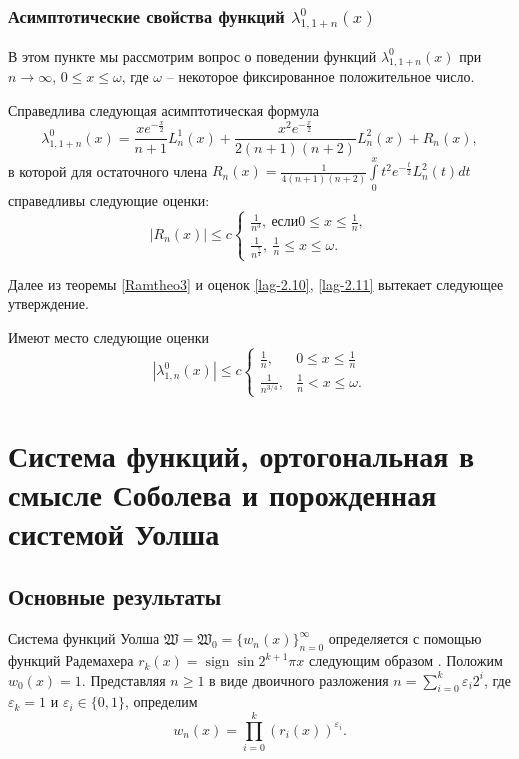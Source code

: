 \subsection{Асимптотические свойства функций $\lambda_{1,1+n}^{0}(x)$}
В этом пункте мы рассмотрим вопрос о поведении функций $\lambda_{1,1+n}^{0}(x)$ при $n\rightarrow\infty$, $0\leq x\leq \omega$, где $\omega$ -- некоторое фиксированное положительное число.
\begin{theorem}\label{Ramtheo3}
	Справедлива следующая асимптотическая формула
	\begin{equation*}
	\lambda_{1,1+n}^{0}(x) = \frac{xe^{-\frac{x}{2}}}{n+1}L_n^1(x)+\frac{x^2e^{-\frac{x}{2}}}{2(n+1)(n+2)}L_n^2(x)+R_n(x),
	\end{equation*}
	в которой для остаточного члена $R_n(x)=\frac{1}{4(n+1)(n+2)}\int\limits_0^x t^2e^{-\frac{t}{2}}L_{n}^{2}(t)dt$ справедливы следующие оценки:
	\begin{equation*}
	|R_n(x)|\leq
	c \left\{\begin{gathered}
	\frac{1}{n^3},\ если 0\leq x\leq \frac{1}{n},\\
	\frac{1}{n^\frac{7}{4}},\ \frac{1}{n}\leq x\leq \omega.
	\end{gathered}\right.
	\end{equation*}
\end{theorem}
Далее из теоремы \ref{Ramtheo3} и оценок \eqref{lag-2.10}, \eqref{lag-2.11} вытекает следующее утверждение.
\begin{corollary}
	Имеют место следующие оценки
	$$
	|\lambda_{1,n}^{0}(x)|\leq c
	\begin{cases}
	\frac{1}{n}, & 0\leq x\leq \frac{1}{n} \\
	\frac{1}{n^{3/4}}, & \frac{1}{n}< x\leq \omega.
	\end{cases}
	$$
\end{corollary}







\chapter{Система функций, ортогональная в смысле Соболева и порожденная системой Уолша}

\section{Основные результаты}
Система функций Уолша $\mathfrak{W}=\mathfrak{W}_0=\{w_n(x)\}_{n=0}^\infty$ определяется с помощью функций Радемахера $r_k(x)=\operatorname{sign}\sin 2^{k+1}\pi x$ следующим образом \cite{walsh-GolubovBook}. Положим $w_0(x)=1$. Представляя $n \ge 1$ в виде двоичного разложения $n=\sum_{i=0}^{k}\varepsilon_i2^i$, где $\varepsilon_k=1$ и $\varepsilon_i \in \{0,1\}$, определим
\begin{equation}
w_n(x)=\prod_{i=0}^{k}(r_i(x))^{\varepsilon_i}.
\end{equation}

